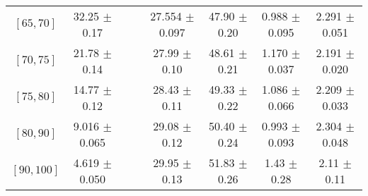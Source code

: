 \begin{tabular}{c||c|c|c|c|c|c|c}
$[65, 70]$ & 32.25 $\pm$ 0.17 &  &  & 27.554 $\pm$ 0.097 & 47.90 $\pm$ 0.20 & 0.988 $\pm$ 0.095 & 2.291 $\pm$ 0.051\\
$[70, 75]$ & 21.78 $\pm$ 0.14 &  &  & 27.99 $\pm$ 0.10 & 48.61 $\pm$ 0.21 & 1.170 $\pm$ 0.037 & 2.191 $\pm$ 0.020\\
$[75, 80]$ & 14.77 $\pm$ 0.12 &  &  & 28.43 $\pm$ 0.11 & 49.33 $\pm$ 0.22 & 1.086 $\pm$ 0.066 & 2.209 $\pm$ 0.033\\
$[80, 90]$ & 9.016 $\pm$ 0.065 &  &  & 29.08 $\pm$ 0.12 & 50.40 $\pm$ 0.24 & 0.993 $\pm$ 0.093 & 2.304 $\pm$ 0.048\\
$[90, 100]$ & 4.619 $\pm$ 0.050 &  &  & 29.95 $\pm$ 0.13 & 51.83 $\pm$ 0.26 & 1.43 $\pm$ 0.28 & 2.11 $\pm$ 0.11\\
\end{tabular}
